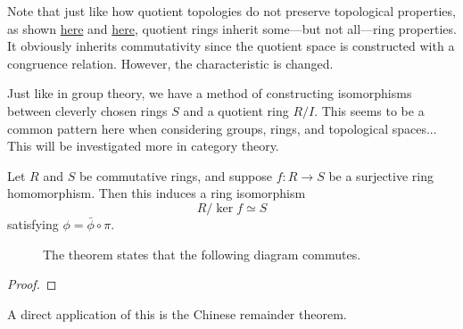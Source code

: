   Note that just like how quotient topologies do not preserve topological properties, as shown \hyperref[pst-quotient_trivial]{here} and \hyperref[pst-quotient_hausdorff]{here}, quotient rings inherit some---but not all---ring properties. It obviously inherits commutativity since the quotient space is constructed with a congruence relation. However, the characteristic is changed. 

  Just like in group theory, we have a method of constructing isomorphisms between cleverly chosen rings $S$ and a quotient ring $R/I$. This seems to be a common pattern here when considering groups, rings, and topological spaces... This will be investigated more in category theory. 

  \begin{theorem}
    Let $R$ and $S$ be commutative rings, and suppose $f: R \rightarrow S$ be a surjective ring homomorphism. Then this induces a ring isomorphism
    \begin{equation}
      R /\ker{f} \simeq S
    \end{equation} 
    satisfying $\phi = \bar{\phi} \circ \pi$. 

    \begin{figure}[H]
      \centering 
      \caption{The theorem states that the following diagram commutes. } 
      \label{fig:fund_ring_homo_theorem}
    \end{figure}
  \end{theorem}
  \begin{proof}
    
  \end{proof} 

  A direct application of this is the Chinese remainder theorem. 

